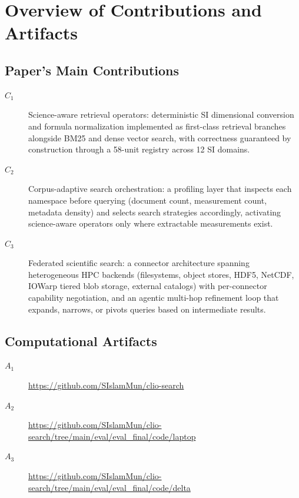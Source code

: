 \documentclass[conference]{IEEEtran}
\begin{document}


\appendixAD

\section{Overview of Contributions and Artifacts}

\subsection{Paper's Main Contributions}

\begin{description}
\item[$C_1$] Science-aware retrieval operators: deterministic SI dimensional conversion and formula normalization implemented as first-class retrieval branches alongside BM25 and dense vector search, with correctness guaranteed by construction through a 58-unit registry across 12 SI domains.
\item[$C_2$] Corpus-adaptive search orchestration: a profiling layer that inspects each namespace before querying (document count, measurement count, metadata density) and selects search strategies accordingly, activating science-aware operators only where extractable measurements exist.
\item[$C_3$] Federated scientific search: a connector architecture spanning heterogeneous HPC backends (filesystems, object stores, HDF5, NetCDF, IOWarp tiered blob storage, external catalogs) with per-connector capability negotiation, and an agentic multi-hop refinement loop that expands, narrows, or pivots queries based on intermediate results.
\end{description}


\subsection{Computational Artifacts}

\begin{description}
\item[$A_1$] \url{https://github.com/SIslamMun/clio-search}
\item[$A_2$] \url{https://github.com/SIslamMun/clio-search/tree/main/eval/eval_final/code/laptop}
\item[$A_3$] \url{https://github.com/SIslamMun/clio-search/tree/main/eval/eval_final/code/delta}
\end{description}
\end{document}
